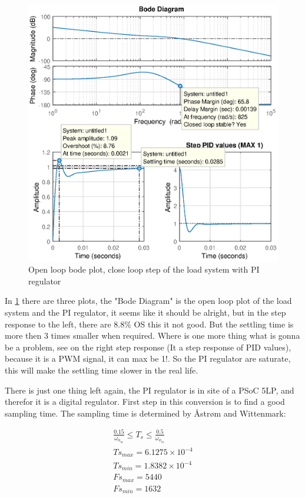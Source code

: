 \begin{figure}[H]
	\centering
	\includegraphics [width=6in]{Hardware/Pictures/RolingRoad_PI_result.eps}
	\caption{Open loop bode plot, close loop step of the load system with PI regulator}
	\label{fig:Open_loop_bode_close_loop_step_load_system}
\end{figure}

In \ref{fig:Open_loop_bode_close_loop_step_load_system} there are three plots, the "Bode Diagram" is the open loop plot of the load system and the PI regulator, it seems like it should be alright, but in the step response to the left, there are $ 8.8 \% $ OS this it not good. But the settling time is more then 3 times smaller when required. Where is one more thing what is gonna be a problem, see on the right step response (It a step response of PID values), because it is a PWM signal, it can max be 1!. So the PI regulator are saturate, this will make the settling time slower in the real life. 

There is just one thing left again, the PI regulator is in site of a PSoC 5LP, and therefor it is a digital regulator. First step in this conversion is to find a good sampling time. The sampling time is determined by Åstrøm and Wittenmark:

\begin{equation}
\begin{split}
	\frac{0.15}{\omega _{\phi _{m}}} \leq T_{s} \leq \frac{0.5}{\omega _{\phi _{m}}}\\
	Ts_{max} = 6.1275 \times 10^{-4}\\
	Ts_{min} = 1.8382 \times 10^{-4}\\
	Fs_{max} = 5440\\
	Fs_{min} = 1632
\end{split}
\end{equation}

